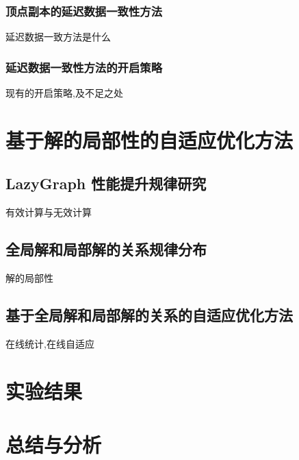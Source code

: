 \documentclass[twoside]{Style/ucasthesis}%
\begin{document}
\subsection{顶点副本的延迟数据一致性方法}
延迟数据一致方法是什么
\subsection{延迟数据一致性方法的开启策略}
现有的开启策略,及不足之处


\chapter{基于解的局部性的自适应优化方法}
\section{LazyGraph 性能提升规律研究}
有效计算与无效计算
\section{全局解和局部解的关系规律分布}
解的局部性
\section{基于全局解和局部解的关系的自适应优化方法}
在线统计,在线自适应



\chapter{实验结果}

\chapter{总结与分析}


\cleardoublepage%
\end{document}
